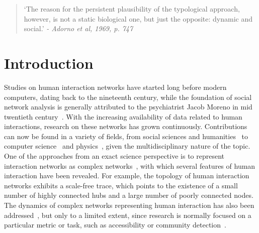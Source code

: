 \documentclass[%
	aip,
	jmp,%
	amsmath,amssymb,
	reprint,%
]{revtex4-1}
\begin{document}
\begin{quotation}
	`The reason for the persistent plausibility of the typological approach, however, is not a static biological one, but just the opposite: dynamic and social.' 
	\emph{- Adorno et al, 1969, p. 747}
\end{quotation}


\section{Introduction}\label{sec:into}
Studies on human interaction networks have started long before modern computers, dating back to the nineteenth century, while the foundation of
social network analysis is generally attributed to the psychiatrist Jacob Moreno in mid twentieth century~\cite{newmanBook}. With the increasing availability of data related to human interactions, research on these networks has grown continuously. Contributions can now be found in a variety of fields, from social sciences and humanities~\cite{latour2013} to computer science~\cite{bird} and physics~\cite{barabasiHumanDyn,newmanFriendship}, given the multidisciplinary nature of the topic. One of the approaches from an exact science perspective is to represent interaction networks as complex networks~\cite{barabasiHumanDyn,newmanFriendship}, with which 
several features of human interaction have been revealed. For example, the topology of human interaction networks exhibits a scale-free trace, which points to the existence of a small number of highly connected hubs and a large number of poorly connected nodes. The dynamics of complex networks representing human interaction has also been addressed~\cite{barabasiEvo,newmanEvolving}, but only to a limited extent, since research is normally focused on a particular metric or task, such as accessibility or community detection~\cite{access,newmanModularity}. 
\end{document}
